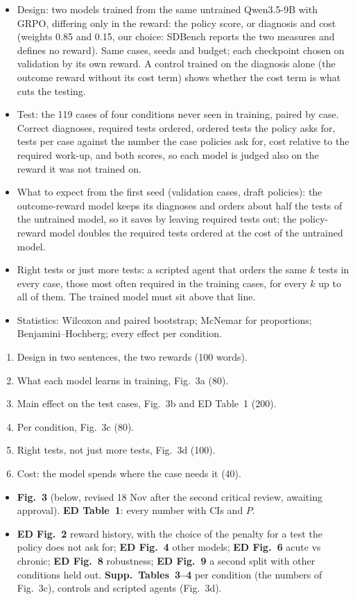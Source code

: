 \content
\begin{itemize}
\item Design: two models trained from the same untrained Qwen3.5-9B with GRPO, differing only in the
reward: the policy score, or diagnosis and cost (weights 0.85 and 0.15, our choice: SDBench reports
the two measures and defines no reward). Same cases, seeds and budget; each checkpoint chosen on
validation by its own reward. A control trained on the diagnosis alone (the outcome reward without
its cost term) shows whether the cost term is what cuts the testing.
\item Test: the 119 cases of four conditions never seen in training, paired by case. Correct diagnoses,
required tests ordered, ordered tests the policy asks for, tests per case against the number the case
policies ask for, cost relative to the required work-up, and both scores, so each model is judged
also on the reward it was not trained on.
\item What to expect from the first seed (validation cases, draft policies): the outcome-reward model
keeps its diagnoses and orders about half the tests of the untrained model, so it saves by leaving
required tests out; the policy-reward model doubles the required tests ordered at the cost of the
untrained model.
\item Right tests or just more tests: a scripted agent that orders the same $k$ tests in every case,
those most often required in the training cases, for every $k$ up to all of them. The trained model
must sit above that line.
\item Statistics: Wilcoxon and paired bootstrap; McNemar for proportions; Benjamini--Hochberg; every
effect per condition.
\end{itemize}

\structure
\begin{enumerate}
\item Design in two sentences, the two rewards (100 words).
\item What each model learns in training, Fig.~3a (80).
\item Main effect on the test cases, Fig.~3b and ED Table~1 (200).
\item Per condition, Fig.~3c (80).
\item Right tests, not just more tests, Fig.~3d (100).
\item Cost: the model spends where the case needs it (40).
\end{enumerate}

\artefacts
\begin{itemize}
\item \textbf{Fig.~3} (below, revised 18 Nov after the second critical review, awaiting approval).
\textbf{ED Table~1}: every number with CIs and $P$.
\item \textbf{ED Fig.~2} reward history, with the choice of the penalty for a test the policy does not
ask for; \textbf{ED Fig.~4} other models; \textbf{ED Fig.~6} acute vs chronic; \textbf{ED Fig.~8}
robustness; \textbf{ED Fig.~9} a second split with other conditions held out. \textbf{Supp.\
Tables~3--4} per condition (the numbers of Fig.~3c), controls and scripted agents (Fig.~3d).
\end{itemize}

